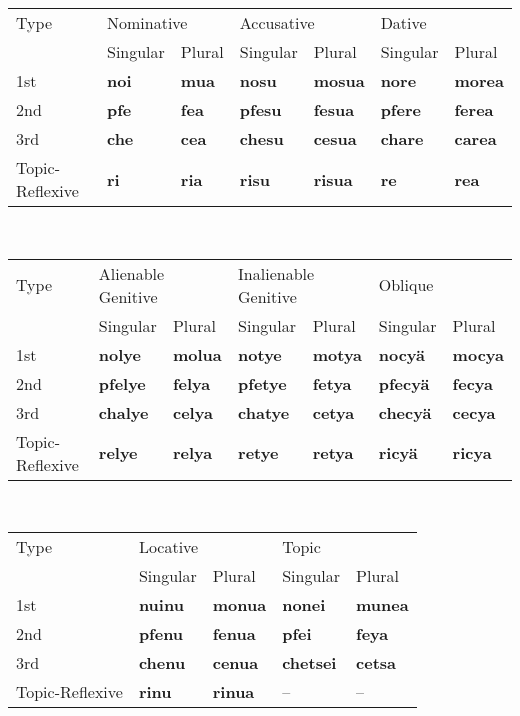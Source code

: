 \documentclass{article}
\begin{document}
\begin{table}[h]
\begin{tabular}{l | l l | l l | l l}
Type & \multicolumn{2}{|l|}{Nominative} & \multicolumn{2}{|l|}{Accusative} & \multicolumn{2}{|l}{Dative} \\
& Singular & Plural & Singular & Plural & Singular & Plural \\
\hline
1st & \textbf{noi} & \textbf{mua} & \textbf{nosu} & \textbf{mosua} & \textbf{nore} & \textbf{morea} \\
2nd & \textbf{pfe} & \textbf{fea} & \textbf{pfesu} & \textbf{fesua} & \textbf{pfere} & \textbf{ferea} \\
3rd & \textbf{che} & \textbf{cea} & \textbf{chesu} & \textbf{cesua} & \textbf{chare} & \textbf{carea} \\
Topic-Reflexive & \textbf{ri} & \textbf{ria} & \textbf{risu} & \textbf{risua} & \textbf{re} & \textbf{rea} \\
\end{tabular} \\[0.5cm]

\begin{tabular}{l | l l | l l | l l}
Type & \multicolumn{2}{|l|}{Alienable Genitive} & \multicolumn{2}{|l|}{Inalienable Genitive} & \multicolumn{2}{|l}{Oblique} \\
& Singular & Plural & Singular & Plural & Singular & Plural \\
\hline
1st & \textbf{nolye} & \textbf{molua} & \textbf{notye} & \textbf{motya} & \textbf{nocy\"a} & \textbf{mocya} \\
2nd & \textbf{pfelye} & \textbf{felya} & \textbf{pfetye} & \textbf{fetya} & \textbf{pfecy\"a} & \textbf{fecya} \\
3rd & \textbf{chalye} & \textbf{celya} & \textbf{chatye} & \textbf{cetya} & \textbf{checy\"a} & \textbf{cecya} \\
Topic-Reflexive & \textbf{relye} & \textbf{relya} & \textbf{retye} & \textbf{retya} & \textbf{ricy\"a} & \textbf{ricya} \\
\end{tabular} \\[0.5cm]

\begin{tabular}{l | l l | l l}
Type & \multicolumn{2}{|l|}{Locative} & \multicolumn{2}{|l}{Topic} \\
& Singular & Plural & Singular & Plural \\
\hline
1st & \textbf{nuinu} & \textbf{monua} & \textbf{nonei} & \textbf{munea} \\
2nd & \textbf{pfenu} & \textbf{fenua} & \textbf{pfei} & \textbf{feya} \\
3rd & \textbf{chenu} & \textbf{cenua} & \textbf{chetsei} & \textbf{cetsa} \\
Topic-Reflexive & \textbf{rinu} & \textbf{rinua} & -- & -- \\
\end{tabular}
\end{table}
\end{document}
